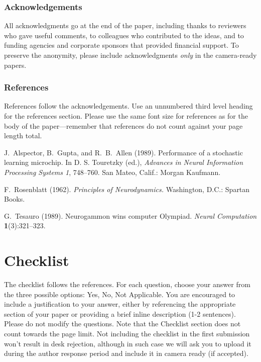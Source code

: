 \documentclass[twoside]{article}
\begin{document}
\subsubsection*{Acknowledgements}
All acknowledgments go at the end of the paper, including thanks to reviewers who gave useful comments, to colleagues who contributed to the ideas, and to funding agencies and corporate sponsors that provided financial support. 
To preserve the anonymity, please include acknowledgments \emph{only} in the camera-ready papers.


\subsubsection*{References}

References follow the acknowledgements.  Use an unnumbered third level
heading for the references section.  Please use the same font
size for references as for the body of the paper---remember that
references do not count against your page length total.

\begin{thebibliography}{}
\setlength{\itemindent}{-\leftmargin}
\makeatletter\renewcommand{\@biblabel}[1]{}\makeatother
\bibitem{} J.~Alspector, B.~Gupta, and R.~B.~Allen (1989).
    \newblock Performance of a stochastic learning microchip.
    \newblock In D. S. Touretzky (ed.),
    \textit{Advances in Neural Information Processing Systems 1}, 748--760.
    San Mateo, Calif.: Morgan Kaufmann.

\bibitem{} F.~Rosenblatt (1962).
    \newblock \textit{Principles of Neurodynamics.}
    \newblock Washington, D.C.: Spartan Books.

\bibitem{} G.~Tesauro (1989).
    \newblock Neurogammon wins computer Olympiad.
    \newblock \textit{Neural Computation} \textbf{1}(3):321--323.
\end{thebibliography}

\section*{Checklist}


The checklist follows the references. For each question, choose your answer from the three possible options: Yes, No, Not Applicable.  You are encouraged to include a justification to your answer, either by referencing the appropriate section of your paper or providing a brief inline description (1-2 sentences). 
Please do not modify the questions.  Note that the Checklist section does not count towards the page limit. Not including the checklist in the first submission won't result in desk rejection, although in such case we will ask you to upload it during the author response period and include it in camera ready (if accepted).
\end{document}
